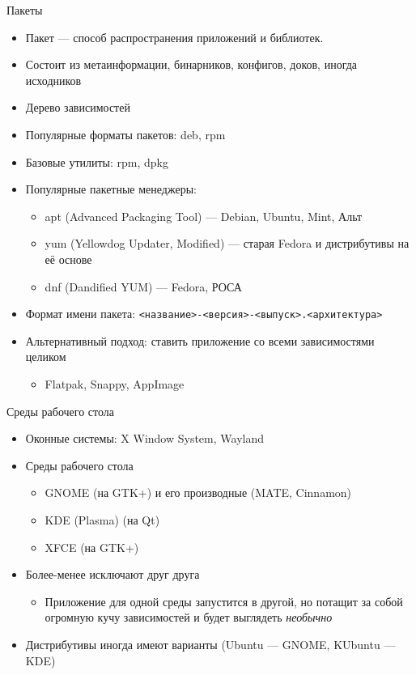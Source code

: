 \documentclass{../../slides-style}
\begin{document}
    \begin{frame}{Пакеты}
        \begin{itemize}
            \item Пакет --- способ распространения приложений и библиотек. 
            \item Состоит из метаинформации, бинарников, конфигов, доков, иногда исходников
            \item Дерево зависимостей
            \item Популярные форматы пакетов: deb, rpm
            \item Базовые утилиты: rpm, dpkg
            \item Популярные пакетные менеджеры: 
            \begin{itemize}
                \item apt (Advanced Packaging Tool) --- Debian, Ubuntu, Mint, Альт
                \item yum (Yellowdog Updater, Modified) --- старая Fedora и дистрибутивы на её основе
                \item dnf (Dandified YUM) --- Fedora, РОСА
            \end{itemize}
            \item Формат имени пакета: \texttt{<название>-<версия>-<выпуск>.<архитектура>}
            \item Альтернативный подход: ставить приложение со всеми зависимостями целиком
            \begin{itemize}
                \item Flatpak, Snappy, AppImage
            \end{itemize}
        \end{itemize}
    \end{frame}

    \begin{frame}{Среды рабочего стола}
        \begin{itemize}
            \item Оконные системы: X Window System, Wayland
            \item Среды рабочего стола
            \begin{itemize}
                \item GNOME (на GTK+) и его производные (MATE, Cinnamon)
                \item KDE (Plasma) (на Qt)
                \item XFCE (на GTK+)
            \end{itemize}
            \item Более-менее исключают друг друга
            \begin{itemize}
                \item Приложение для одной среды запустится в другой, но потащит за собой огромную кучу зависимостей и будет выглядеть \emph{необычно}
            \end{itemize}
            \item Дистрибутивы иногда имеют варианты (Ubuntu --- GNOME, KUbuntu --- KDE)
        \end{itemize}
    \end{frame}
\end{document}

